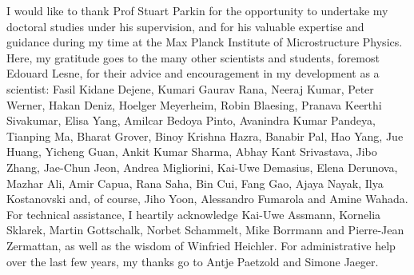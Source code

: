 
I would like to thank Prof Stuart Parkin for the opportunity to undertake my doctoral 
studies under his supervision, and for his valuable expertise and guidance during my time 
at the Max Planck Institute of Microstructure Physics. Here, my gratitude goes to the many 
other scientists and students, foremost Edouard Lesne, for their advice and encouragement in
my development as a scientist: Fasil Kidane Dejene, Kumari Gaurav Rana, Neeraj Kumar, Peter 
Werner, Hakan Deniz, Hoelger Meyerheim, Robin Blaesing, Pranava Keerthi Sivakumar, Elisa 
Yang, Amilcar Bedoya Pinto, Avanindra Kumar Pandeya, Tianping Ma, Bharat Grover, Binoy 
Krishna Hazra, Banabir Pal, Hao Yang, Jue Huang, Yicheng Guan, Ankit Kumar Sharma, Abhay 
Kant Srivastava, Jibo Zhang, Jae-Chun Jeon, Andrea Migliorini, Kai-Uwe Demasius, Elena 
Derunova, Mazhar Ali, Amir Capua, Rana Saha, Bin Cui, Fang Gao, Ajaya Nayak, Ilya Kostanovski 
and, of course, Jiho Yoon, Alessandro Fumarola and Amine Wahada. For technical assistance, 
I heartily acknowledge Kai-Uwe Assmann, Kornelia Sklarek, Martin Gottschalk, Norbet Schammelt, 
Mike Borrmann and Pierre-Jean Zermattan, as well as the wisdom of Winfried Heichler. 
For administrative help over the last few years, my thanks go to Antje Paetzold and Simone
Jaeger.